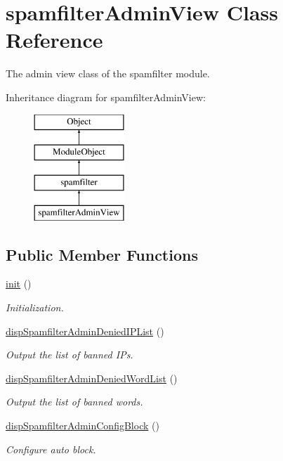 \hypertarget{classspamfilterAdminView}{}\section{spamfilter\+Admin\+View Class Reference}
\label{classspamfilterAdminView}


The admin view class of the spamfilter module.  


Inheritance diagram for spamfilter\+Admin\+View\+:\begin{figure}[H]
\begin{center}
\leavevmode
\includegraphics[height=4.000000cm]{classspamfilterAdminView}
\end{center}
\end{figure}
\subsection*{Public Member Functions}
\begin{DoxyCompactItemize}
\item 
\hyperlink{classspamfilterAdminView_a730d6c05c58e74495095975303da5be1}{init} ()
\begin{DoxyCompactList}\small\item\em Initialization. \end{DoxyCompactList}\item 
\hyperlink{classspamfilterAdminView_ab568df0fe3a41960908ad05538d16335}{disp\+Spamfilter\+Admin\+Denied\+I\+P\+List} ()
\begin{DoxyCompactList}\small\item\em Output the list of banned I\+Ps. \end{DoxyCompactList}\item 
\hyperlink{classspamfilterAdminView_a1cca57b5c55b8739e21fa3e3a984df72}{disp\+Spamfilter\+Admin\+Denied\+Word\+List} ()
\begin{DoxyCompactList}\small\item\em Output the list of banned words. \end{DoxyCompactList}\item 
\hyperlink{classspamfilterAdminView_a9619c9c4492158c50bb7d07d0bd4fb63}{disp\+Spamfilter\+Admin\+Config\+Block} ()
\begin{DoxyCompactList}\small\item\em Configure auto block. \end{DoxyCompactList}\end{DoxyCompactItemize}
